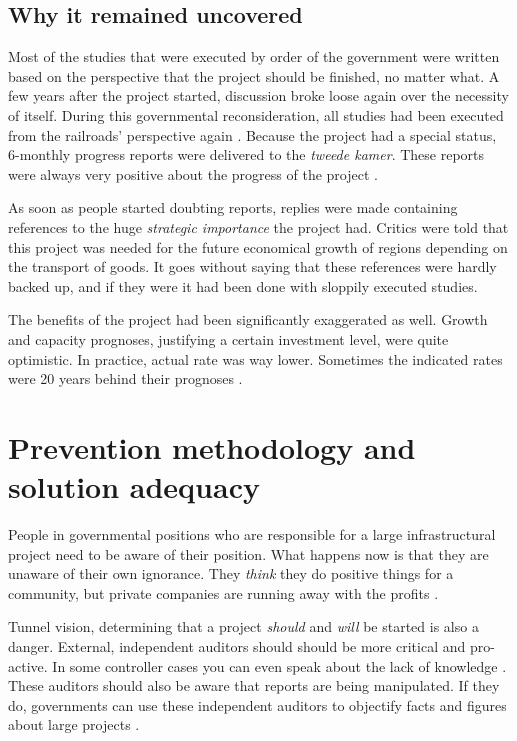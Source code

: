 \documentclass[]{uva-bachelor-thesis}
\begin{document}
\subsection{Why it remained uncovered}
Most of the studies that were executed by order of the government were written based on the perspective that the project should be finished, no matter what. 
A few years after the project started, discussion broke loose again over the necessity of itself. 
During this governmental reconsideration, all studies had been executed from the railroads' perspective again \cite{beleidsinformatie-betuweroute, commissie-duivesteijn}.
Because the project had a special status, 6-monthly progress reports were delivered to the \emph{tweede kamer}. 
These reports were always very positive about the progress of the project \cite{commissie-duivesteijn}.

As soon as people started doubting reports, replies were made containing references to the huge \emph{strategic importance} the project had. 
Critics were told that this project was needed for the future economical growth of regions depending on the transport of goods.
It goes without saying that these references were hardly backed up, and if they were it had been done with sloppily executed studies\cite{de2012verstrikking, eenvandaag}.

The benefits of the project had been significantly exaggerated as well. 
Growth and capacity prognoses, justifying a certain investment level, were quite optimistic. 
In practice, actual rate was way lower. 
Sometimes the indicated rates were 20 years behind their prognoses \cite{beleidsinformatie-betuweroute, commissie-duivesteijn}.

\section{Prevention methodology and solution adequacy}
People in governmental positions who are responsible for a large infrastructural project need to be aware of their position.
What happens now is that they are unaware of their own ignorance. 
They \emph{think} they do positive things for a community, but private companies are running away with the profits \cite{eenvandaag}.

Tunnel vision, determining that a project \emph{should} and \emph{will} be started is also a danger. 
External, independent auditors should \cite{eenvandaag, de2012verstrikking} should be more critical and pro-active. 
In some controller cases you can even speak about the lack of knowledge \cite{huys2009politics}.
These auditors should also be aware that reports are being manipulated.
If they do, governments can use these independent auditors to objectify facts and figures about large projects \cite{eenvandaag}.
\end{document}
